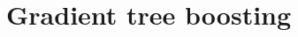

\section{Gradient tree boosting}
\setcounter{theorem}{0}
\setcounter{equation}{0}


\renewcommand{\theenumi}{\roman{enumi}}
\renewcommand{\labelenumi}{\textnormal{(\theenumi)}$\;\;$}


\renewcommand{\theenumi}{\arabic{enumi}}
\renewcommand{\labelenumi}{\textnormal{(\theenumi)}$\;\;$}
\renewcommand{\labelenumii}{\textnormal{(\theenumii)}$\;\;$}

